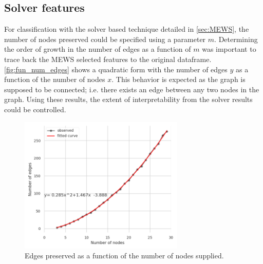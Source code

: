 \documentclass[msthesis.tex]{subfiles}
\begin{document}
\subsection{Solver features}
\label{subsec:solverfeat}
For classification with the solver based technique detailed in \autoref{sec:MEWS}, the number of nodes preserved could be specified using a parameter $m$. Determining the order of growth in the number of edges as a function of $m$ was important to trace back the MEWS selected features to the original dataframe. \autoref{fig:fun_num_edges} shows a quadratic form with the number of edges $y$ as a function of the number of nodes $x$. This behavior is expected as the graph is supposed to be connected; i.e. there exists an edge between any two nodes in the graph. Using these results, the extent of interpretability from the solver results could be controlled. 
\begin{figure}
    \centering
    \includegraphics[width=0.7\textwidth]{images/Gender_nodes_preserved.png}
    \caption{Edges preserved as a function of the number of nodes supplied.}
    \label{fig:fun_num_edges}
\end{figure}
\end{document}
